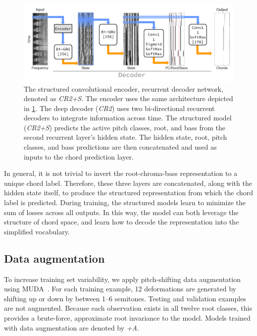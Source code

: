 \documentclass{article}
\begin{document}
\begin{figure}
    \centering
    \includegraphics[width=\columnwidth]{crnn2}
    \caption{The structured convolutional encoder, recurrent decoder network, denoted as \emph{CR2+S}.
    The encoder uses the same architecture depicted in \cref{fig:crnn2}.
    The deep decoder (\emph{CR2}) uses two bi-directional recurrent decoders to integrate information across time.
    The structured model (\emph{CR2+S}) predicts the active pitch classes, root, and bass from the second recurrent layer's hidden state.
    The hidden state, root, pitch classes, and bass predictions are then concatenated and used as inputs to the chord prediction layer.\label{fig:crnn2}}
\end{figure}

In general, it is not trivial to invert the root-chroma-bass representation to a unique chord label.
Therefore, these three layers are concatenated, along with the hidden state itself, to produce the structured representation from which the chord label is predicted.
During training, the structured models learn to minimize the sum of losses across all outputs.
In this way, the model can both leverage the structure of chord space, and learn how to decode the representation into the simplified vocabulary.

\subsection{Data augmentation}
\label{sec:muda}
To increase training set variability, we apply pitch-shifting data augmentation using MUDA~\cite{mcfee2015software}.
For each training example, 12 deformations are generated by shifting up or down by between 1--6 semitones.
Testing and validation examples are not augmented.
Because each observation exists in all twelve root classes, this provides a brute-force, approximate root invariance to the model.
Models trained with data augmentation are denoted by \emph{+A}.
\end{document}
